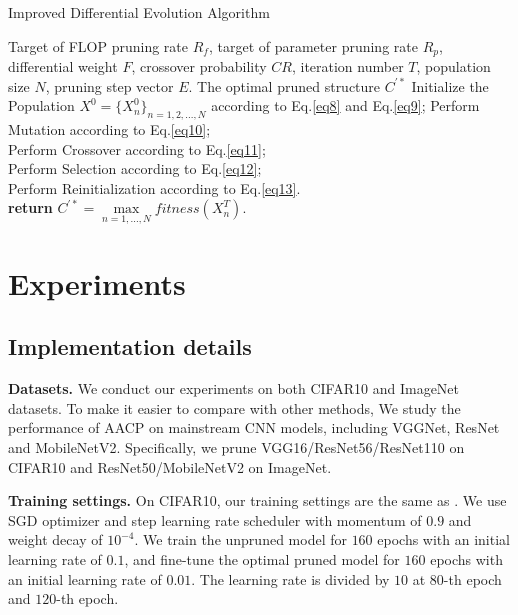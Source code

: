 \documentclass[final]{cvpr}
\begin{document}
\begin{algorithm}[t]
	\renewcommand{\algorithmicrequire}{\textbf{Input:}}
	\renewcommand{\algorithmicensure}{\textbf{Output:}}
	\caption{Improved Differential Evolution Algorithm}
	\label{alg:2}
	\begin{algorithmic}[1]
        \REQUIRE Target of FLOP pruning rate $R_f$, target of parameter pruning rate $R_p$, differential weight $F$,
        crossover probability $CR$, iteration number $T$, population size $N$, pruning step vector $E$.
		\ENSURE The optimal pruned structure ${C}^{'*}$
        \STATE Initialize the Population $X^0 = \{X^0_{n}\}_{n=1,2,...,N}$ according to 
        Eq.\ref{eq8} and Eq.\ref{eq9};
                \STATE Perform Mutation according to Eq.\ref{eq10};\\
                \STATE Perform Crossover according to Eq.\ref{eq11};\\
                \STATE Perform Selection according to Eq.\ref{eq12}; \\
                \STATE Perform Reinitialization according to Eq.\ref{eq13}. \\
            \ENDFOR	
        \ENDFOR
		\STATE \textbf{return} ${C}^{'*} = \max \limits_{n=1,...,N} fitness(X^T_n)$.
	\end{algorithmic}  
\end{algorithm}

\section{Experiments}
\subsection{Implementation details}

\textbf{Datasets.} We conduct our experiments on both CIFAR10 \cite{krizhevsky2009learning} and ImageNet \cite{russakovsky2015imagenet} datasets.
To make it easier to compare with other methods, We study the performance of AACP on mainstream CNN models, including 
VGGNet, ResNet and MobileNetV2. Specifically, we prune VGG16/ResNet56/ResNet110 on CIFAR10 and ResNet50/MobileNetV2 on ImageNet.

\textbf{Training settings.} On CIFAR10, our training settings are the same as \cite{he2019filter}. We use SGD optimizer and step 
learning rate scheduler with momentum of $0.9$ and weight decay of 
$10^{-4}$. We train the unpruned model for $160$ epochs with an initial learning rate of $0.1$, and fine-tune the optimal pruned model 
for $160$ epochs with an initial learning rate of $0.01$. The learning rate is divided by $10$ at $80$-th epoch and $120$-th epoch.  
\end{document}
